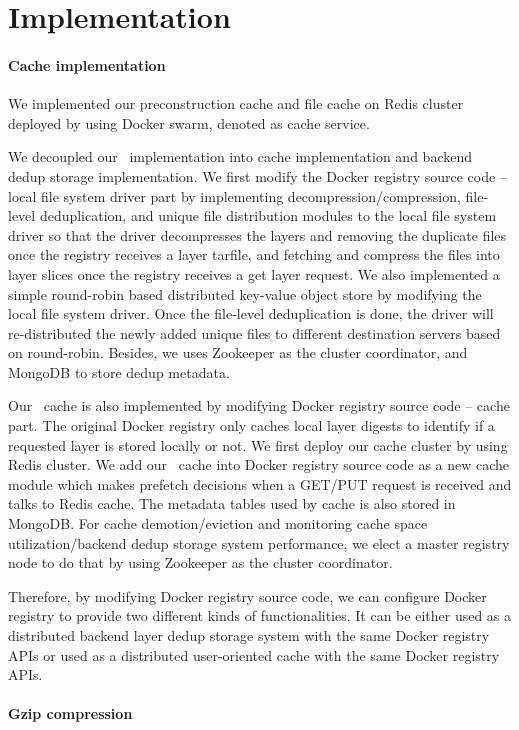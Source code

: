 \section{Implementation}
\label{sec:impl}

\paragraph{Cache implementation}
We implemented our preconstruction cache and \filecachename file cache on Redis cluster
deployed by using Docker swarm, denoted as cache service.

We decoupled our \sysname~implementation into cache implementation and backend dedup storage implementation. 
We first modify the Docker registry source code -- local file system driver part by implementing decompression/compression, file-level deduplication, and 
unique file distribution modules to the local file system driver so that the driver decompresses the layers and removing the duplicate files once the registry receives a layer tarfile, and fetching and compress the files into layer slices once the registry receives a get layer request. 
We also implemented a simple round-robin based distributed key-value object store by modifying the local file system driver. 
Once the file-level deduplication is done, the driver will re-distributed the newly added unique files to different destination servers based on round-robin. 
Besides, we uses Zookeeper as the cluster coordinator, and MongoDB to store dedup metadata.

Our \sysname~cache is also implemented by modifying Docker registry source code -- cache part. 
The original Docker registry only caches local layer digests to identify if a requested layer is stored locally or not. 
We first deploy our cache cluster by using Redis cluster. 
We add our \sysname~cache into Docker registry source code as a new cache module which makes prefetch decisions when a GET/PUT request is received and talks to Redis cache. The metadata tables used by cache is also stored in MongoDB. For cache demotion/eviction and monitoring cache space utilization/backend dedup storage system performance, we elect a master registry node to do that by using Zookeeper as the cluster coordinator. 

Therefore, by modifying Docker registry source code, we can configure Docker registry to provide two different kinds of functionalities. It can be either used as a distributed backend layer dedup storage system with the same Docker registry APIs or used as a distributed user-oriented cache with the same Docker registry APIs.

\paragraph{Gzip compression}